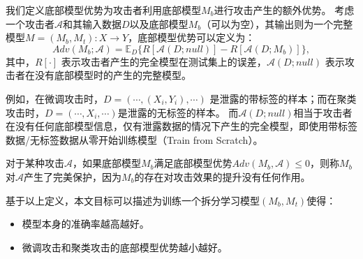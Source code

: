 \begin{definition}[底部模型优势]
    我们定义底部模型优势为攻击者利用底部模型$M_b$进行攻击产生的额外优势。
    考虑一个攻击者$\mathcal A$和其输入数据$D$以及底部模型$M_b$（可以为空），其输出则为一个完整模型$M = (M_b, M_t): X \to Y$，底部模型优势可以定义为：
    \begin{equation}
        Adv(M_b; \mathcal A) = \mathbb E_D \{ R[\mathcal A(D; null)] - R[\mathcal A(D; M_b)]\},
    \end{equation}
    其中，$R[\cdot]$ 表示攻击者产生的完全模型在测试集上的误差，$\mathcal A(D; null)$ 表示攻击者在没有底部模型时的产生的完整模型。
\end{definition}
%
例如，在微调攻击时，$D = (\cdots, (X_i, Y_i), \cdots)$ 是泄露的带标签的样本；而在聚类攻击时，$D = (\cdots, X_i, \cdots)$是泄露的无标签的样本。
%
而$\mathcal A(D; null)$相当于攻击者在没有任何底部模型信息，仅有泄露数据的情况下产生的完全模型，即使用带标签数据/无标签数据从零开始训练模型（Train from Scratch）。

\begin{definition}[完美保护]
    对于某种攻击$\mathcal A$，如果底部模型$M_b$满足底部模型优势$Adv(M_b, \mathcal A) \le 0$，则称$M_b$对$\mathcal A$产生了完美保护，因为$M_b$的存在对攻击效果的提升没有任何作用。
\end{definition}

基于以上定义，本文目标可以描述为训练一个拆分学习模型$(M_b, M_t)$使得：
\begin{itemize}
    \item 模型本身的准确率越高越好。
    \item 微调攻击和聚类攻击的底部模型优势越小越好。
\end{itemize}